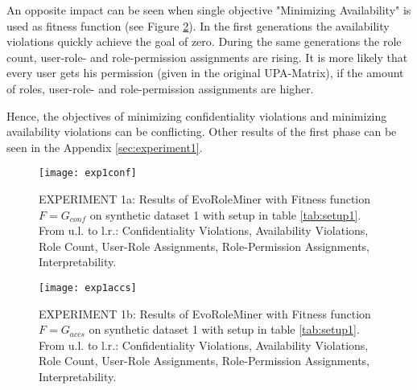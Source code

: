 An opposite impact can be seen when single objective "Minimizing Availability" is used as fitness function (see Figure \ref{fig:exp1accs}). In the first generations the availability violations quickly achieve the goal of zero. During the same generations the role count, user-role- and role-permission assignments are rising. It is more likely that every user gets his permission (given in the original UPA-Matrix), if the amount of roles, user-role- and role-permission assignments are higher.

Hence, the objectives of minimizing confidentiality violations and minimizing availability violations can be conflicting. Other results of the first phase can be seen in the Appendix \ref{sec:experiment1}.

\begin{figure}[H]
    \centering
    \texttt{[image: exp1conf]}
    \caption{EXPERIMENT 1a: Results of EvoRoleMiner with Fitness function $F=G_{conf}$ on synthetic dataset 1 with setup in table \ref{tab:setup1}. From u.l. to l.r.: Confidentiality Violations, Availability Violations, Role Count, User-Role Assignments, Role-Permission Assignments, Interpretability.}
    \label{fig:exp1conf}
\end{figure}

\begin{figure}[H]
    \centering
    \texttt{[image: exp1accs]}
    \caption{EXPERIMENT 1b: Results of EvoRoleMiner with Fitness function $F=G_{accs}$ on synthetic dataset 1 with setup in table \ref{tab:setup1}. From u.l. to l.r.: Confidentiality Violations, Availability Violations, Role Count, User-Role Assignments, Role-Permission Assignments, Interpretability.}
    \label{fig:exp1accs}
\end{figure}